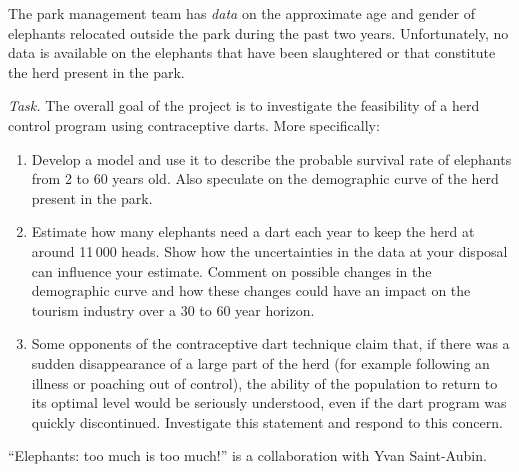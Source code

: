 The park management team has \emph{data} on the approximate age and gender of elephants relocated outside the park during the past two years. 
Unfortunately, no data is available on the elephants that have been slaughtered or that constitute the herd present in the park. 

\emph{Task.} The overall goal of the project is to investigate the feasibility of a herd control program using contraceptive darts. 
More specifically:

\begin{enumerate}[label=\emph{\arabic*.}]
	\item Develop a model and use it to describe the probable survival rate of elephants from 2 to 60 years old. Also speculate on the demographic curve of the herd present in the park.

	\item Estimate how many elephants need a dart each year to keep the herd at around 11\,000 heads. Show how the uncertainties in the data at your disposal can influence your estimate. Comment on possible changes in the demographic curve and how these changes could have an impact on the tourism industry over a 30 to 60 year horizon.

	\item Some opponents of the contraceptive dart technique claim that, if there was a sudden disappearance of a large part of the herd (for example following an illness or poaching out of control), the ability of the population to return to its optimal level would be seriously understood, even if the dart program was quickly discontinued. Investigate this statement and respond to this concern.

\end{enumerate}



%
%



\vfill

\hfill ``Elephants: too much is too much!'' is a collaboration with Yvan Saint-Aubin.


\begin{noexercises}
\end{noexercises}
